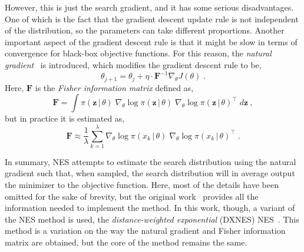 However, this is just the search gradient, and it has some serious disadvantages. One of 
which is the fact that the gradient descent update rule is not independent of the 
distribution, so the parameters can take different proportions. Another important aspect of 
the gradient descent rule is that it might be slow in terms of convergence for black-box 
objective functions. For this reason, the \emph{natural gradient}~\cite{amariNaturalGradientWorks1998,amariWhyNaturalGradient1998} is introduced, which 
modifies the gradient descent rule to be,
\begin{equation}
    \theta_{j + 1} = \theta_{j} + \eta \cdot \bm{F}^{-1} \nabla_{\theta} J(\theta)
    \; .
    \label{eq:natural-gradient}
\end{equation}
Here, \(\bm{F}\) is the \emph{Fisher information matrix} defined as,
\begin{equation}
    \bm{F} = \int \pi(\bm{z} \, \vert \, \theta) \; 
    \nabla_{\theta} \log{\pi(\bm{z} \, \vert \, \theta)} \;
    {\nabla_{\theta} \log{\pi(\bm{z} \, \vert \, \theta)}}^{\top} \;
    d \bm{z}
    \: ,
    \label{eq:fisher-matrix}
\end{equation}
but in practice it is estimated as,
\begin{equation}
    \bm{F} \approx \frac{1}{\lambda} \sum_{k=1}^{\lambda} 
    \nabla_{\theta} \log{\pi(x_k \, \vert \, \theta)} \;
    {\nabla_{\theta} \log{\pi(x_k \, \vert \, \theta)}}^{\top}
    \; .
    \label{eq:fisher-estimation}
\end{equation}

In summary, NES attempts to estimate the search distribution using the natural gradient 
such that, when sampled, the search distribution will in average output the minimizer to 
the objective function. Here, most of the details have been omitted for the sake of 
brevity, but the original work~\cite{wierstraNaturalEvolutionStrategies2014a} provides all 
the information needed to implement the method. In this work, though, a variant of the NES 
method is used, the \emph{distance-weighted exponential} (DXNES)
NES~\cite{fukushimaProposalDistanceweightedExponential2011,nomuraDistanceweightedExponentialNatural2021}. 
This method is a variation on the way the natural gradient and Fisher information matrix 
are obtained, but the core of the method remains the same.